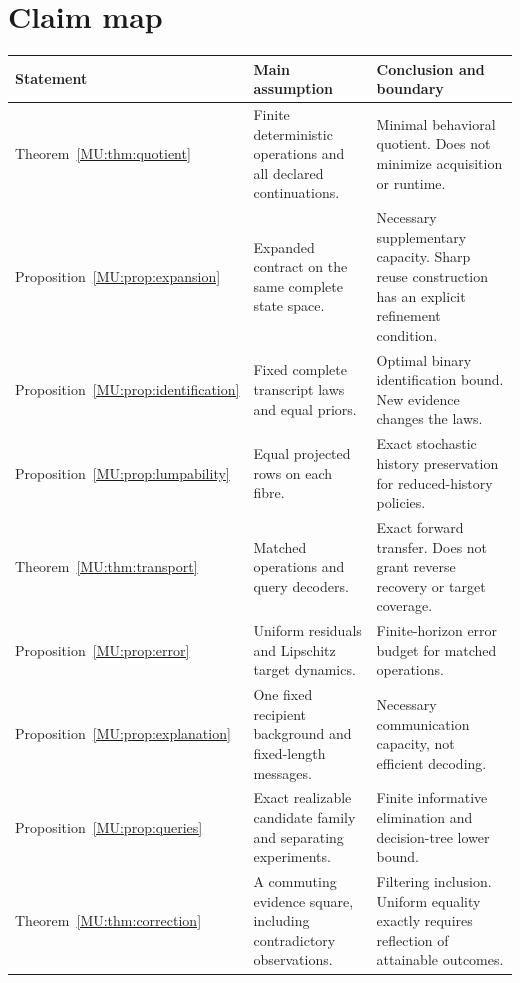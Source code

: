 \documentclass[11pt,oneside,openany]{book}
\numberwithin{equation}{section}
\begin{document}
\section{Claim map}\label{MU:app:claims}
\begin{center}\small
\begin{tabularx}{\textwidth}{@{}P{1.35in}P{1.55in}X@{}}\toprule
Statement & Main assumption & Conclusion and boundary\\\midrule
Theorem~\ref{MU:thm:quotient} & Finite deterministic operations and all declared continuations. & Minimal behavioral quotient. Does not minimize acquisition or runtime.\\
Proposition~\ref{MU:prop:expansion} & Expanded contract on the same complete state space. & Necessary supplementary capacity. Sharp reuse construction has an explicit refinement condition.\\
Proposition~\ref{MU:prop:identification} & Fixed complete transcript laws and equal priors. & Optimal binary identification bound. New evidence changes the laws.\\
Proposition~\ref{MU:prop:lumpability} & Equal projected rows on each fibre. & Exact stochastic history preservation for reduced-history policies.\\
Theorem~\ref{MU:thm:transport} & Matched operations and query decoders. & Exact forward transfer. Does not grant reverse recovery or target coverage.\\
Proposition~\ref{MU:prop:error} & Uniform residuals and Lipschitz target dynamics. & Finite-horizon error budget for matched operations.\\
Proposition~\ref{MU:prop:explanation} & One fixed recipient background and fixed-length messages. & Necessary communication capacity, not efficient decoding.\\
Proposition~\ref{MU:prop:queries} & Exact realizable candidate family and separating experiments. & Finite informative elimination and decision-tree lower bound.\\
Theorem~\ref{MU:thm:correction} & A commuting evidence square, including contradictory observations. & Filtering inclusion. Uniform equality exactly requires reflection of attainable outcomes.\\\bottomrule
\end{tabularx}\end{center}
\end{document}
